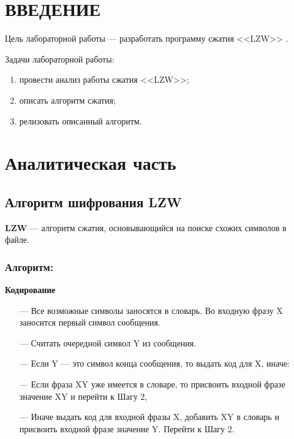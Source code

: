 \section*{\large{ВВЕДЕНИЕ}}

Цель лабораторной работы --- разработать программу сжатия <<LZW>> \cite{Enigma}.

Задачи лабораторной работы:

\begin{enumerate}
    \item провести анализ работы сжатия <<LZW>>;
    \item описать алгоритм сжатия;
    \item релизовать описанный алгоритм.
\end{enumerate}

\clearpage
\section{Аналитическая часть}

\subsection{Алгоритм шифрования LZW}

\textbf{LZW} \cite{Enigma} --- алгоритм сжатия, основывающийся на поиске схожих символов в файле.

\subsubsection{Алгоритм:}

\textbf{Кодирование}

\begin{itemize}
	\item[---]  Все возможные символы заносятся в словарь. Во входную фразу X
  заносится первый символ сообщения.
	\item[---] Считать очередной символ Y
  из сообщения.
	\item[---] Если Y --- это символ конца сообщения, то выдать код для X, иначе:
	\item[---] Если фраза XY уже имеется в словаре, то присвоить входной фразе значение XY и перейти к Шагу 2,
	\item[---] Иначе выдать код для входной фразы X, добавить XY в словарь и присвоить входной фразе значение Y. Перейти к Шагу 2.

\end{itemize}

